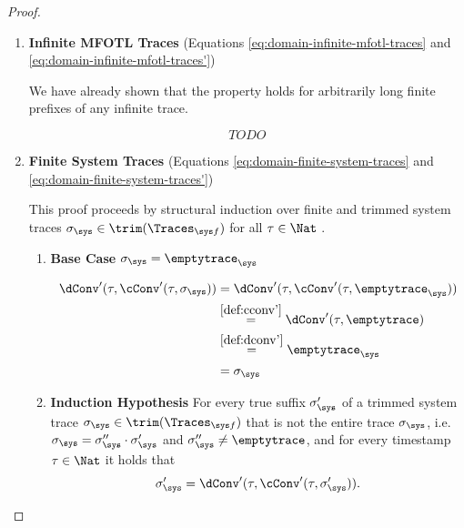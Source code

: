 \begin{proof}
\begin{enumerate}
        We have now shown \ref{eq:domain-finite-mfotl-traces} 
        which does imply \ref{eq:domain-finite-mfotl-traces'}.
        
        \item \textbf{Infinite MFOTL Traces}
            (Equations \ref{eq:domain-infinite-mfotl-traces} and 
            \ref{eq:domain-infinite-mfotl-traces'})
            
        We have already shown that the property holds for arbitrarily
        long finite prefixes of any infinite trace.
        

        \begin{equation*}
            TODO
        \end{equation*}
        
        \item \textbf{Finite System Traces}
            (Equations \ref{eq:domain-finite-system-traces} and 
            \ref{eq:domain-finite-system-traces'})

        This proof proceeds by structural induction over finite and trimmed system traces
        $\sigma_\sys \in \trim(\Traces_{\sys f})$ for all $\tau \in \Nat$
        .
            \begin{enumerate}
                \item \textbf{Base Case} $\sigma_\sys = \emptytrace_\sys$

                \begin{align*}
                    \dConv'(\tau, \cConv'(\tau, \sigma_\sys))
                    &=  \dConv'(\tau, \cConv'(\tau, \emptytrace_\sys)) \\
                    &\stackrel{\ref{def:cconv'}}{=}
                        \dConv'(\tau, \emptytrace) \\
                    &\stackrel{\ref{def:dconv'}}{=}
                        \emptytrace_\sys \\
                    &= \sigma_\sys
                \end{align*}

                \item \textbf{Induction Hypothesis}
                For every true suffix $\sigma_\sys'$ of a trimmed system trace
                $\sigma_\sys \in \trim(\Traces_{\sys f})$
                that is not the entire trace $\sigma_\sys$, i.e.
                $\sigma_\sys = \sigma_\sys'' \cdot \sigma_\sys'$ and
                $\sigma_\sys'' \neq \emptytrace$,
                and for every timestamp $\tau \in \Nat$
                it holds that
                \begin{equation*}
                    \sigma_\sys'
                    = \dConv'(\tau, \cConv'(\tau, \sigma_\sys')).
                \end{equation*}


\end{enumerate}
\end{enumerate}
\end{proof}
